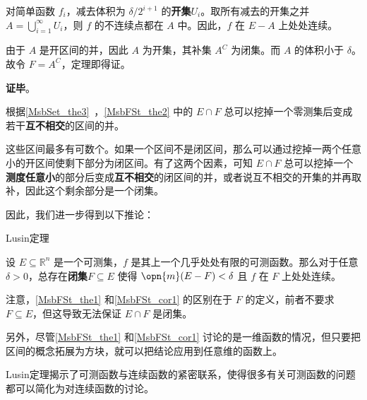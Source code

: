 对简单函数 $f_i$，减去体积为 $\delta/2^{i+1}$ 的\textbf{开集}$U_i$。取所有减去的开集之并 $A=\bigcup_{i=1}^\infty U_i$，则 $f$ 的不连续点都在 $A$ 中。因此，$f$ 在 $E-A$ 上处处连续。

由于 $A$ 是开区间的并，因此 $A$ 为开集，其补集 $A^C$ 为闭集。而 $A$ 的体积小于 $\delta$。故令 $F=A^C$，定理即得证。

\textbf{证毕}。

根据\autoref{MsbSet_the3}~，\autoref{MsbFSt_the2} 中的 $E\cap F$ 总可以挖掉一个零测集后变成若干\textbf{互不相交}的区间的并。

这些区间最多有可数个。如果一个区间不是闭区间，那么可以通过挖掉一两个任意小的开区间使剩下部分为闭区间。有了这两个因素，可知 $E\cap F$ 总可以挖掉一个\textbf{测度任意小}的部分后变成\textbf{互不相交}的闭区间的并，或者说互不相交的开集的并再取补，因此这个剩余部分是一个闭集。

因此，我们进一步得到以下推论：

\begin{corollary}{Lusin定理}\label{MsbFSt_cor1}

设 $E\subseteq\mathbb{R}^n$ 是一个可测集，$f$ 是其上一个几乎处处有限的可测函数。那么对于任意 $\delta>0$，总存在\textbf{闭集}$F\subseteq E$ 使得 $\opn{m}(E-F)<\delta$ 且 $f$ 在 $F$ 上处处连续。

\end{corollary}

注意，\autoref{MsbFSt_the1} 和\autoref{MsbFSt_cor1} 的区别在于 $F$ 的定义，前者不要求 $F\subseteq E$，但这导致无法保证 $E\cap F$ 是闭集。

另外，尽管\autoref{MsbFSt_the1} 和\autoref{MsbFSt_cor1} 讨论的是一维函数的情况，但只要把区间的概念拓展为方块，就可以把结论应用到任意维的函数上。

Lusin定理揭示了可测函数与连续函数的紧密联系，使得很多有关可测函数的问题都可以简化为对连续函数的讨论。















